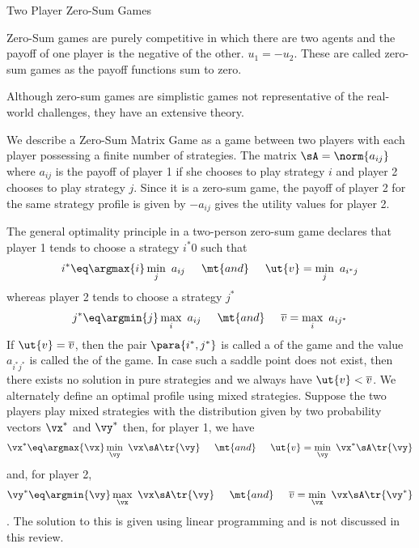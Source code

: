 \documentclass{article}
\begin{document}
\begin{psection}{Two Player Zero-Sum Games}

	Zero-Sum games are purely competitive in which there are two agents and the payoff of one player is the negative of the other. $u_1 = - u_2$. These are called zero-sum games as the payoff functions sum to zero.

	Although zero-sum games are simplistic games not representative of the real-world challenges, they have an extensive theory.

	We describe a Zero-Sum Matrix Game as a game between two players with each player possessing a finite number of strategies. The matrix $\sA = \norm{a_{ij}}$ where $a_{ij}$ is the payoff of player 1 if she chooses to play strategy $i$ and player 2 chooses to play strategy $j$. Since it is a zero-sum game, the payoff of player 2 for the same strategy profile is given by $-a_{ij}$ gives the utility values for player 2.

	The general optimality principle in a two-person zero-sum game declares that player 1 tends to choose a strategy $i^\ast0$ such that
	\begin{align}
		i^\ast \eq \argmax{i} \min_{j}\ a_{ij} \hspace{5mm} \mt{and} \hspace{5mm} \ut{v} = \min_{j}\ a_{i^\ast j}
	\end{align}
	whereas player 2 tends to choose a strategy $j^\ast$
	\begin{align}
		j^\ast \eq \argmin{j} \max_{i}\ a_{ij} \hspace{5mm} \mt{and} \hspace{5mm} \overline{v} = \max_{i}\ a_{i j^\ast}
	\end{align}
	If $\ut{v} = \overline{v}$, then the pair $\para{i^\ast, j^\ast}$ is called a  of the game and the value $a_{i^\ast j^\ast}$ is called the  of the game. In case such a saddle point does not exist, then there exists no solution in pure strategies and we always have $\ut{v} < \overline{v}$. We alternately define an optimal profile using mixed strategies. Suppose the two players play mixed strategies with the distribution given by two probability vectors $\vx^\ast$ and $\vy^\ast$ then, for player 1, we have
	\begin{align}
		\vx^\ast \eq \argmax{\vx} \min_{\vy}\ \vx \sA \tr{\vy} \hspace{5mm} \mt{and} \hspace{5mm} \ut{v} = \min_{\vy}\ \vx^\ast \sA \tr{\vy}
	\end{align}
	and, for player 2,
	\begin{align}
		\vy^\ast \eq \argmin{\vy} \max_{\vx}\ \vx \sA \tr{\vy} \hspace{5mm} \mt{and} \hspace{5mm} \overline{v} = \min_{\vx}\ \vx \sA \tr{\vy^\ast}
	\end{align}.
	The solution to this is given using linear programming and is not discussed in this review.


\end{psection}
\end{document}
